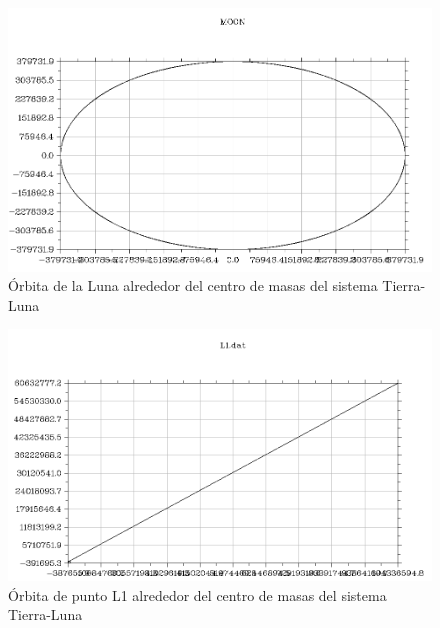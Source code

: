 \documentclass{article}
\begin{document}
	\begin{figure}[h!]
		\begin{center}
			\includegraphics[scale=0.4]{moon.png}
			\caption{Órbita de la Luna alrededor del centro de masas del sistema Tierra-Luna}
		\end{center}
	\end{figure}

	\newpage

	\begin{figure}[h!]
		\begin{center}
			\includegraphics[scale=0.5]{l1.png}
			\caption{Órbita de punto L1 alrededor del centro de masas del sistema Tierra-Luna}
		\end{center}
	\end{figure}
\end{document}
